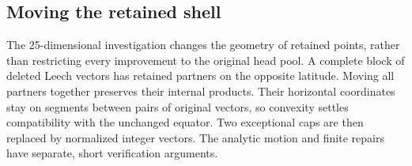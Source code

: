 \subsection{Moving the retained shell}
The 25-dimensional investigation changes the geometry of retained points,
rather than restricting every improvement to the original head pool.
A complete block of deleted Leech vectors has retained partners on the
opposite latitude. Moving all partners together preserves their internal
products. Their horizontal coordinates stay on segments between pairs of
original vectors, so convexity settles compatibility with the unchanged
equator. Two exceptional caps are then replaced by normalized integer
vectors. The analytic motion and finite repairs have separate, short
verification arguments.
